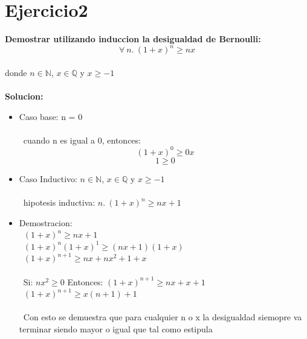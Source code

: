 \documentclass[10pt,a4paper]{article}
\begin{document}
\section*{Ejercicio2}
\textbf{Demostrar utilizando induccion la desigualdad de Bernoulli:}
\[
        \forall\ n.\ (1+x)^n\geq nx
\]
\\donde $n\in \mathbb{N}$, $x\in \mathbb{Q}$ y $x\geq -1$
\\
\\
\textbf{Solucion:} 
\begin{itemize}
\item Caso base: n = 0
\\
\\
\ cuando n es igual a 0, entonces:
\[
\ (1+x)^0\geq 0x\] 
\[\ 1\geq 0\]

\item Caso Inductivo: $n\in \mathbb{N}$, $x\in \mathbb{Q}$ y $x\geq -1$
\\
\\
\ hipotesis inductiva: $n.\ (1+x)^n\geq nx+1$
\\
\item Demostracion:
\\
\ $(1+x)^n\geq nx+1$ 
\\
\ $(1+x)^n (1+x)^1\geq (nx+1)(1+x)$
\\
\ $(1+x)^{n+1}\geq nx+nx^2+1+x$ 
\\
\\
\ Si: $nx^2\geq 0$ Entonces: $(1+x)^{n+1}\geq nx+x+1$
\\
\ $(1+x)^{n+1}\geq x(n+1)+1$
\\
\\
\ Con esto se demuestra que para cualquier n o x la desigualdad siemopre va terminar siendo mayor o igual que tal como estipula 
\end{itemize}
\end{document}
